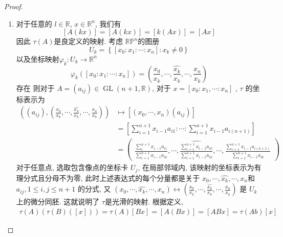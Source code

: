 \documentclass[../main.tex]{subfiles}
\begin{document}
\begin{proof}
    \begin{enumerate}
        \item[a).]   对于任意的 \(  l \in \mathbb{R}   \), \(  x \in \mathbb{R} ^{n}  \), 我们有 \[
        [A\left( kx \right) ]= [A\left( kx \right) ]= [k \left( Ax \right) ]= [Ax]
        \] 因此 \(  \tau \left( A \right)   \)是良定义的映射.  考虑 \(  \mathbb{RP}^{n}  \)的图册 \[
        U_{k}= \left\{ [x_0: x_1:\cdots :x_{n}] : x_{k}\neq 0 \right\}
        \] 以及坐标映射\(   \varphi _{k}: U_{k}\to  \mathbb{R} ^{n} \)  \[
         \varphi _{k}\left( [x_0:x_1:\cdots :x_{n}] \right)=\left( \frac{x_0 }{x_{k} },\cdots , \frac{\hat{x_{k}} }{x_{k} } ,\cdots , \frac{x_{n} }{x_{k} }   \right)    
        \]存在  则对于 \(  A= \left( a_{ij} \right)\in  \operatorname{GL} \left( n+ 1 ,\mathbb{R} \right)    \), 对于 \(  x= [x_0:x_1,\cdots :x_{n}]  \)  , \(  \tau   \) 的坐标表示为 \[
       \begin{aligned}
  \left(  \left( a_{ij} \right),   \left( \frac{x_0 }{x_{k} },\cdots , \frac{\hat{x_{k}} }{x_{k} },\cdots , \frac{x_{n} }{x_{k} }    \right)  \right) & \mapsto  [\left( x_0,\cdots ,x_{n} \right) \left( a_{ij} \right) ]\\ 
        &= \left[ \sum _{i = 1}^{n+ 1}x_{i-1}a_{i 1} : \cdots :\sum _{i= 1}^{n+ 1}x_{i-1}a_{i \left( n+ 1 \right) } \right] \\ 
         &= \begin{pmatrix} 
             \frac{\sum _{i} ^{n+ 1}x_{i-1}a_{i1}}{\sum _{i = 1}^{n+ 1}x_{i-1}a_{i k} }  ,\cdots , \widehat{ \frac{\sum _{i= 1}^{n+ 1}x_{i-1}a_{i k} }{\sum _{i = 1}^{n+ 1}x_{i-1}a_{i k} } },\cdots , \frac{\sum _{i = 1}^{n+ 1}x_{i-1}a_{i \left( n+ 1 \right) } }{\sum _{i = 1}^{n+ 1}x_{i -1} a_{i k} } 
         \end{pmatrix} 
       \end{aligned}
        \] 对于任意点, 选取包含像点的坐标卡 $U_j$, 在局部邻域内, 该映射的坐标表示为有理分式且分母不为零, 此时上述表达式的每个分量都是关于 \(  x_0,\cdots ,\hat{x_{k}},\cdots ,x_{n}  \)和 \(  a_{ij},1\le i,j\le n+ 1  \) 的分式,  又 \(  \left( x_0,\cdots , \hat{x_{k}},\cdots ,x_{n} \right) \leftrightarrow \left( \frac{x_0 }{x_{k} },\cdots , \frac{\hat{x_{k}} }{x_{k} },\cdots ,\frac{x_{n} }{x_{k} }    \right)    \) 是 \(  U_{k}  \)上的微分同胚. 这就说明了 \(  \tau   \)是光滑的映射. 根据定义,  \[
        \begin{aligned}
        \tau \left( A  \right)  \left( \tau \left( B \right)\left( [x] \right)   \right)= \tau \left( A \right)[Bx]= [A \left( Bx \right) ]= [ABx]= \tau \left( Ab \right)[x]   

\end{aligned}\]
\end{enumerate}
\end{proof}
\end{document}
